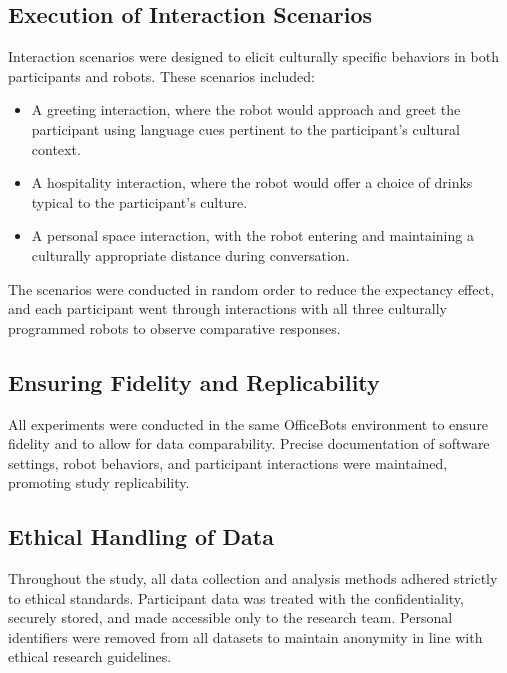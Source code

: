 \subsection{Execution of Interaction Scenarios}

Interaction scenarios were designed to elicit culturally specific behaviors in both participants and robots. These scenarios included:

\begin{itemize}
    \item A greeting interaction, where the robot would approach and greet the participant using language cues pertinent to the participant's cultural context.
    \item A hospitality interaction, where the robot would offer a choice of drinks typical to the participant's culture.
    \item A personal space interaction, with the robot entering and maintaining a culturally appropriate distance during conversation.
\end{itemize}

The scenarios were conducted in random order to reduce the expectancy effect, and each participant went through interactions with all three culturally programmed robots to observe comparative responses.

\subsection{Ensuring Fidelity and Replicability}

All experiments were conducted in the same OfficeBots environment to ensure fidelity and to allow for data comparability. Precise documentation of software settings, robot behaviors, and participant interactions were maintained, promoting study replicability.

\subsection{Ethical Handling of Data}

Throughout the study, all data collection and analysis methods adhered strictly to ethical standards. Participant data was treated with the confidentiality, securely stored, and made accessible only to the research team. Personal identifiers were removed from all datasets to maintain anonymity in line with ethical research guidelines.


